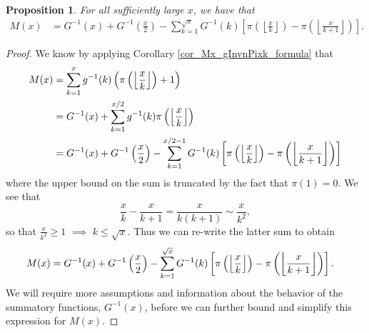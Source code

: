 \documentclass[11pt,reqno,a4letter]{article}
\numberwithin{figure}{section}
\numberwithin{table}{section}
\newcommand{\Floor}[2]{\ensuremath{\left\lfloor \frac{#1}{#2} \right\rfloor}}
\theoremstyle{plain}
\newtheorem{prop}[theorem]{Proposition}
\numberwithin{theorem}{section}
\theoremstyle{definition}
\begin{document}
\begin{prop} 
\label{prop_Mx_SBP_IntegralFormula} 
For all sufficiently large $x$, we have that 
\begin{align} 
\label{eqn_pf_tag_v2-restated_v2} 
M(x) & = G^{-1}(x) + G^{-1}\left(\frac{x}{2}\right) - 
     \sum_{k=1}^{\sqrt{x}} G^{-1}(k) \left[ 
     \pi\left(\Floor{x}{k}\right) - \pi\left(\Floor{x}{k+1}\right) 
     \right]. 
\end{align} 
\end{prop} 
\begin{proof} 
We know by applying Corollary \ref{cor_Mx_gInvnPixk_formula} that 
\begin{align} 
\notag
M(x) & = \sum_{k=1}^{x} g^{-1}(k) \left(\pi\left(\Floor{x}{k}\right)+1\right) \\ 
\label{eqn_proof_tag_MxFormulaInitSepTerms_v1} 
     & = G^{-1}(x) + \sum_{k=1}^{x/2} g^{-1}(k) \pi\left(\Floor{x}{k}\right) \\ 
     & = G^{-1}(x) + G^{-1}\left(\frac{x}{2}\right) - 
     \sum_{k=1}^{x/2-1} G^{-1}(k) \left[ 
     \pi\left(\Floor{x}{k}\right) - \pi\left(\Floor{x}{k+1}\right) 
     \right] 
\end{align} 
where the upper bound on the sum is truncated by the fact that $\pi(1) = 0$. 
We see that 
\[
\frac{x}{k} - \frac{x}{k+1} = \frac{x}{k(k+1)} \sim \frac{x}{k^2}, 
\]
so that $\frac{x}{k^2} \geq 1$ $\implies$ $k \leq \sqrt{x}$. 
Thus we can re-write the latter sum to obtain 
\begin{align*} 
\notag
M(x) & = G^{-1}(x) + G^{-1}\left(\frac{x}{2}\right) - 
     \sum_{k=1}^{\sqrt{x}} G^{-1}(k) \left[ 
     \pi\left(\Floor{x}{k}\right) - \pi\left(\Floor{x}{k+1}\right) 
     \right].
\end{align*} 
We will require more assumptions and information about the behavior 
of the summatory functions, $G^{-1}(x)$, before we can further bound and 
simplify this expression for $M(x)$. 
\end{proof} 
\end{document}

